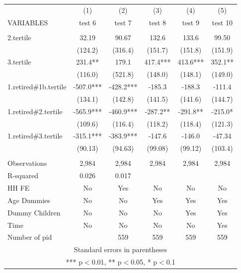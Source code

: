 \begin{tabular}{lccccc} \hline
 & (1) & (2) & (3) & (4) & (5) \\
VARIABLES & test 6 & test 7 & test 8 & test 9 & test 10 \\ \hline
 &  &  &  &  &  \\
2.tertile & 32.19 & 90.67 & 132.6 & 133.6 & 99.50 \\
 & (124.2) & (316.4) & (151.7) & (151.8) & (151.9) \\
3.tertile & 231.4** & 179.1 & 417.4*** & 413.6*** & 352.1** \\
 & (116.0) & (521.8) & (148.0) & (148.1) & (149.0) \\
1.retired\#1b.tertile & -507.0*** & -428.2*** & -185.3 & -188.3 & -111.4 \\
 & (134.1) & (142.8) & (141.5) & (141.6) & (144.7) \\
1.retired\#2.tertile & -565.9*** & -460.9*** & -287.2** & -291.8** & -215.0* \\
 & (109.6) & (116.4) & (118.2) & (118.4) & (121.3) \\
1.retired\#3.tertile & -315.1*** & -383.9*** & -147.6 & -146.0 & -47.34 \\
 & (90.13) & (94.63) & (99.08) & (99.12) & (103.4) \\
 &  &  &  &  &  \\
Observations & 2,984 & 2,984 & 2,984 & 2,984 & 2,984 \\
R-squared & 0.026 & 0.017 &  &  &  \\
HH FE & No & Yes & No & No & No \\
Age Dummies & No & No & Yes & Yes & Yes \\
Dummy Children & No & No & No & Yes & Yes \\
Time & No & No & No & No & Yes \\
 Number of pid &  & 559 & 559 & 559 & 559 \\ \hline
\multicolumn{6}{c}{ Standard errors in parentheses} \\
\multicolumn{6}{c}{ *** p$<$0.01, ** p$<$0.05, * p$<$0.1} \\
\end{tabular}
